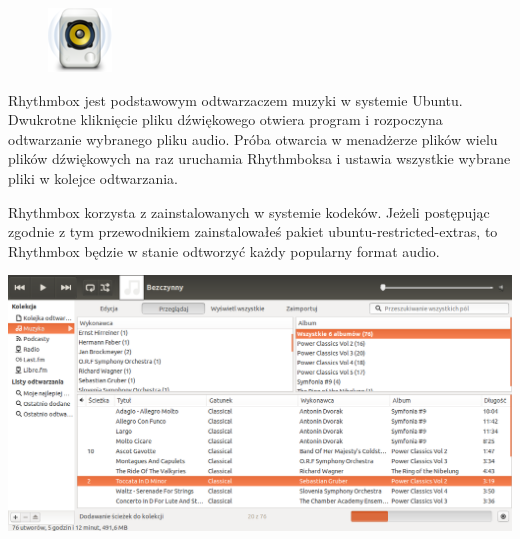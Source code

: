 \begin{figure}
	\vspace{-10pt}
	\includegraphics[width=\linewidth]{images/ikony_rhythmbox.png}
\end{figure}

Rhythmbox jest podstawowym odtwarzaczem muzyki w systemie Ubuntu. Dwukrotne kliknięcie pliku dźwiękowego otwiera program i rozpoczyna odtwarzanie wybranego pliku audio. Próba otwarcia w menadżerze plików wielu plików dźwiękowych na raz uruchamia Rhythmboksa i ustawia wszystkie wybrane pliki w kolejce odtwarzania.

Rhythmbox korzysta z zainstalowanych w systemie kodeków. Jeżeli postępując zgodnie z tym przewodnikiem zainstalowałeś pakiet \textcolor{ubuntu_orange}{ubuntu-restricted-extras}, to Rhythmbox będzie w stanie odtworzyć każdy popularny format audio.
\begin{center}
	\includegraphics[width=\linewidth]{images/programy_rhythmbox1.png}
\end{center}
\clearpage
